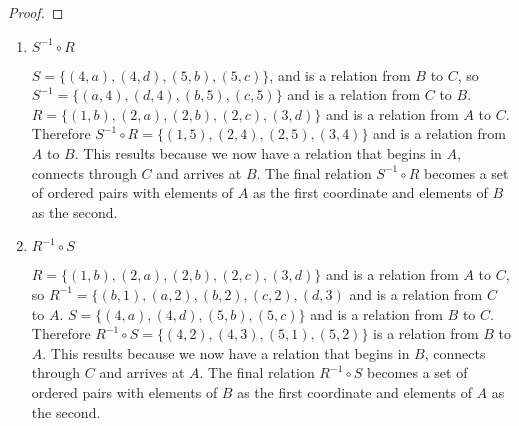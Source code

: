 
\begin{theorem}
\end{theorem}

\begin{proof}
\end{proof}

\begin{enumerate}[label=\alph*]
  \item $S^{-1} \circ R$

    $S=\{(4,a),(4,d),(5,b),(5,c)\}$, and is a relation from $B$ to $C$, so
    $S^{-1}=\{(a,4),(d,4),(b,5),(c,5)\}$ and is a relation from $C$ to $B$.
    $R=\{(1,b),(2,a),(2,b),(2,c),(3,d)\}$ and is a relation from $A$ to
    $C$. Therefore $S^{-1} \circ R = \{(1,5),(2,4),(2,5), (3,4)\}$ and is a
    relation from $A$ to $B$. This results because we now have a relation that
    begins in $A$, connects through $C$ and arrives at $B$. The final relation
    $S^{-1} \circ R$ becomes a set of ordered pairs with elements of $A$ as
    the first coordinate and elements of $B$ as the second.

  \item $R^{-1} \circ S$

    $R=\{(1,b),(2,a),(2,b),(2,c),(3,d)\}$ and is a relation from $A$ to $C$,
    so $R^{-1}=\{(b,1),(a,2),(b,2),(c,2),(d,3)$ and is a relation from $C$ to
    $A$. $S=\{(4,a),(4,d),(5,b),(5,c)\}$ and is a relation from $B$ to $C$.
    Therefore $R^{-1} \circ S = \{(4,2),(4,3),(5,1),(5,2)\}$ is a relation
    from $B$ to $A$. This results because we now have a relation that begins
    in $B$, connects through $C$ and arrives at $A$. The final relation
    $R^{-1} \circ S$ becomes a set of ordered pairs with elements of $B$ as
    the first coordinate and elements of $A$ as the second.
\end{enumerate}
